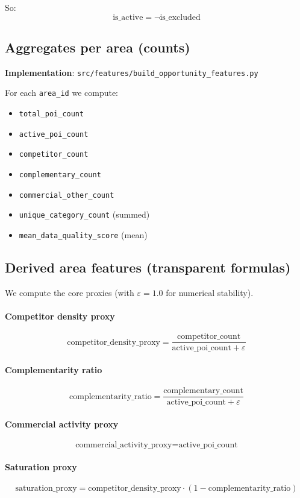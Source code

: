 \documentclass[11pt]{article}
\begin{document}
\noindent So:
\[
\text{is\_active} = \neg \text{is\_excluded}
\]

\subsection{Aggregates per area (counts)}
\noindent\textbf{Implementation}: \texttt{src/features/build\_opportunity\_features.py}

\noindent For each \texttt{area\_id} we compute:
\begin{itemize}
  \item \texttt{total\_poi\_count}
  \item \texttt{active\_poi\_count}
  \item \texttt{competitor\_count}
  \item \texttt{complementary\_count}
  \item \texttt{commercial\_other\_count}
  \item \texttt{unique\_category\_count} (summed)
  \item \texttt{mean\_data\_quality\_score} (mean)
\end{itemize}

\subsection{Derived area features (transparent formulas)}
We compute the core proxies (with $\varepsilon = 1.0$ for numerical stability).

\paragraph{Competitor density proxy}
\[
\text{competitor\_density\_proxy}
=
\frac{\text{competitor\_count}}{\text{active\_poi\_count} + \varepsilon}
\]

\paragraph{Complementarity ratio}
\[
\text{complementarity\_ratio}
=
\frac{\text{complementary\_count}}{\text{active\_poi\_count} + \varepsilon}
\]

\paragraph{Commercial activity proxy}
\[
\text{commercial\_activity\_proxy} = \text{active\_poi\_count}
\]

\paragraph{Saturation proxy}
\[
\text{saturation\_proxy}
=
\text{competitor\_density\_proxy}\cdot (1 - \text{complementarity\_ratio})
\]
\end{document}
